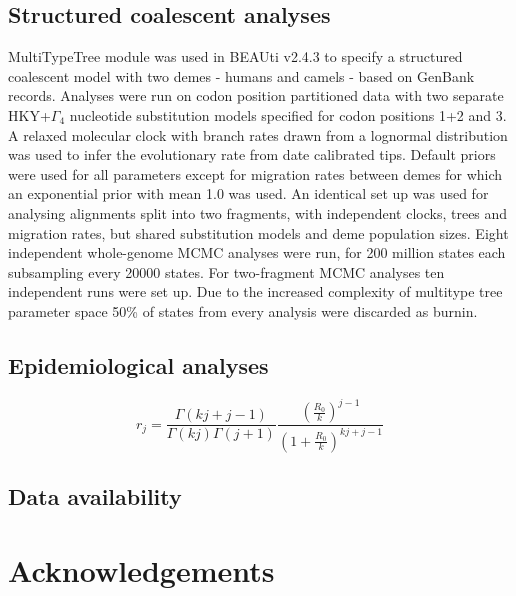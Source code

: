 \documentclass[11pt,oneside,letterpaper]{article}
\begin{document}
\subsection*{Structured coalescent analyses}
MultiTypeTree module was used in BEAUti v2.4.3 to specify a structured coalescent model with two demes - humans and camels - based on GenBank records.
Analyses were run on codon position partitioned data with two separate HKY+$\Gamma_{4}$ nucleotide substitution models specified for codon positions 1+2 and 3.
A relaxed molecular clock with branch rates drawn from a lognormal distribution was used to infer the evolutionary rate from date calibrated tips.
Default priors were used for all parameters except for migration rates between demes for which an exponential prior with mean 1.0 was used.
An identical set up was used for analysing alignments split into two fragments, with independent clocks, trees and migration rates, but shared substitution models and deme population sizes.
Eight independent whole-genome MCMC analyses were run, for 200 million states each subsampling every 20000 states.
For two-fragment MCMC analyses ten independent runs were set up.
Due to the increased complexity of multitype tree parameter space 50\% of states from every analysis were discarded as burnin.

\subsection*{Epidemiological analyses}


\begin{equation}
r_{j} = \frac{\Gamma(kj+j-1)}{\Gamma(kj)\Gamma(j+1)} \frac{(\frac{R_{0}}{k})^{j-1}}{(1+\frac{R_{0}}{k})^{kj+j-1}}
\end{equation}

\subsection*{Data availability}


\section*{Acknowledgements}



\end{document}
